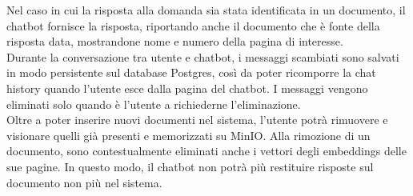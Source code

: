 Nel caso in cui la risposta alla domanda sia stata identificata in un documento, il chatbot fornisce la risposta, riportando anche il documento che è fonte della risposta data, mostrandone nome e numero della pagina di interesse.\\
Durante la conversazione tra utente e chatbot, i messaggi scambiati sono salvati in modo persistente sul database Postgres, così da poter ricomporre la chat history quando l'utente esce dalla pagina del chatbot. I messaggi vengono eliminati solo quando è l'utente a richiederne l'eliminazione.\\
Oltre a poter inserire nuovi documenti nel sistema, l'utente potrà rimuovere e visionare quelli già presenti e memorizzati su MinIO. Alla rimozione di un documento, sono contestualmente eliminati anche i vettori degli embeddings delle sue pagine. In questo modo, il chatbot non potrà più restituire risposte sul documento non più nel sistema.

\newpage